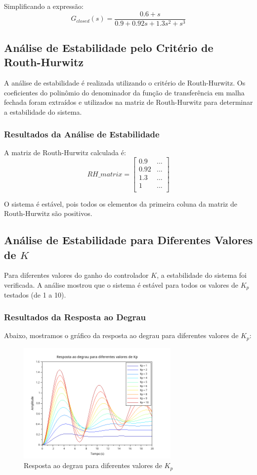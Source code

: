 Simplificando a expressão:
\[
    G_{closed}(s) = \frac{0.6 + s}{0.9 + 0.92s + 1.3s^2 + s^3}
\]

\subsection{Análise de Estabilidade pelo Critério de Routh-Hurwitz}
A análise de estabilidade é realizada utilizando o critério de Routh-Hurwitz. Os coeficientes do polinômio do denominador da função de transferência em malha fechada foram extraídos e utilizados na matriz de Routh-Hurwitz para determinar a estabilidade do sistema.

\subsubsection{Resultados da Análise de Estabilidade}
A matriz de Routh-Hurwitz calculada é:
\[
    RH\_matrix = \begin{bmatrix}
        0.9  & ... \\
        0.92 & ... \\
        1.3  & ... \\
        1    & ... \\
    \end{bmatrix}
\]

O sistema é estável, pois todos os elementos da primeira coluna da matriz de Routh-Hurwitz são positivos.

\subsection{Análise de Estabilidade para Diferentes Valores de \( K \)}
Para diferentes valores do ganho do controlador \( K \), a estabilidade do sistema foi verificada. A análise mostrou que o sistema é estável para todos os valores de \( K_p \) testados (de 1 a 10).

\subsubsection{Resultados da Resposta ao Degrau}
Abaixo, mostramos o gráfico da resposta ao degrau para diferentes valores de \( K_p \):

\begin{figure}[H]
    \centering
    \includegraphics[width=0.7\textwidth]{4-atividade/assets/impulsos-diferentes-kp.png}
    \caption{Resposta ao degrau para diferentes valores de \( K_p \)}
    \label{fig:resposta-degrau-kp}
\end{figure}

